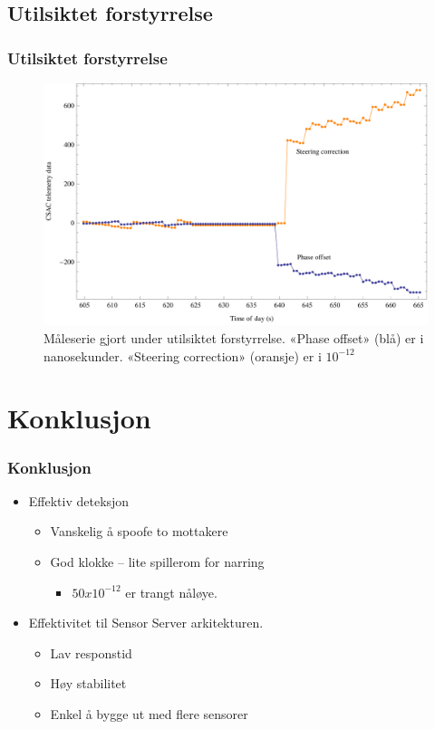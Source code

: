 \documentclass[xcolor=table]{beamer}
\begin{document}
\begin{frame}
\section{Utilsiktet forstyrrelse}
\frametitle{Utilsiktet forstyrrelse}
      \begin{figure}
        \includegraphics[scale=0.70]{thesis/graphics/disturbance57667-csac-telemetry-phase-steer-combined-zoom-in-2-1.png}
        \caption{Måleserie gjort under utilsiktet forstyrrelse. «Phase offset» (blå) er i nanosekunder. «Steering correction» (oransje) er i $10^{-12}$}
      \end{figure}
\end{frame}

\section{Konklusjon}
\begin{frame}
  \frametitle{Konklusjon}
  \begin{itemize}
    \setlength\itemsep{2em}
    \item Effektiv deteksjon 
    \begin{itemize}
      \item Vanskelig å spoofe to mottakere
      \item God klokke -- lite spillerom for narring
	     \begin{itemize}
	       \item $50 x 10^{-12}$ er trangt nåløye.
	     \end{itemize}
    \end{itemize}
    \item Effektivitet til Sensor Server arkitekturen. 
    \begin{itemize}
      \item Lav responstid
      \item Høy stabilitet 
      \item Enkel å bygge ut med flere sensorer
    \end{itemize}
  \end{itemize}
\end{frame}
\end{document}
